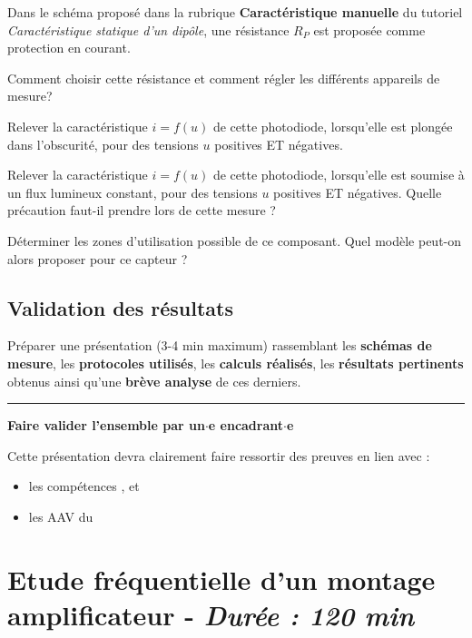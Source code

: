 Dans le schéma proposé dans la rubrique \textbf{Caractéristique manuelle} du tutoriel \textit{Caractéristique statique d'un dipôle}, une résistance $R_P$ est proposée comme protection en courant.

\Quest Comment choisir cette résistance et comment régler les différents appareils de mesure?

\Manip Relever la caractéristique $i=f(u)$ de cette photodiode, lorsqu'elle est plongée dans l'obscurité, pour des tensions $u$ positives ET négatives.

\Manip Relever la caractéristique $i=f(u)$ de cette photodiode, lorsqu'elle est soumise à un flux lumineux constant, pour des tensions $u$ positives ET négatives. Quelle précaution faut-il prendre lors de cette mesure ?

\Manip Déterminer les zones d'utilisation possible de ce composant. Quel modèle peut-on alors proposer pour ce capteur ? 

\subsection{Validation des résultats}

\Real Préparer une présentation (3-4 min maximum) rassemblant les \textbf{schémas de mesure}, les \textbf{protocoles utilisés}, les \textbf{calculs réalisés}, les \textbf{résultats pertinents} obtenus ainsi qu'une \textbf{brève analyse} de ces derniers.

\medskip

\noindent \rule{\linewidth}{1pt}

\textbf{\Large Faire valider l'ensemble par un$\cdot$e encadrant$\cdot$e}

\medskip

Cette présentation devra clairement faire ressortir des preuves en lien avec :

\begin{itemize}
	\item les compétences ,  et 
	\item les AAV du 
\end{itemize}



\clearpage
\section{Etude fréquentielle d'un montage amplificateur - \textit{Durée : 120 min}}

